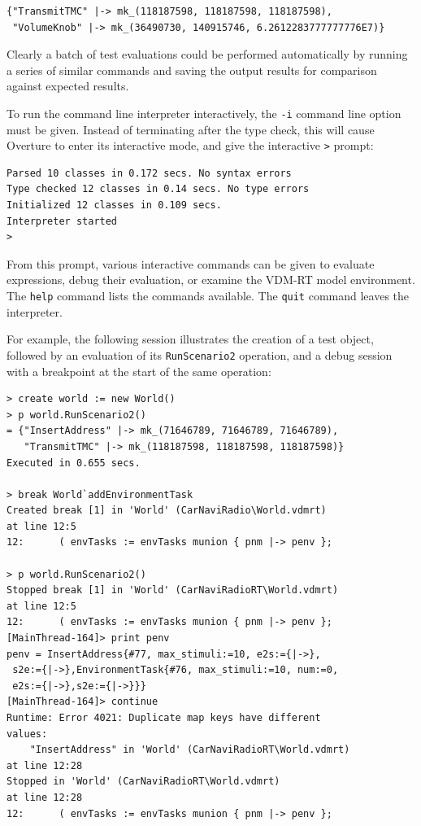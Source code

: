 \begin{lstlisting}
{"TransmitTMC" |-> mk_(118187598, 118187598, 118187598), 
 "VolumeKnob" |-> mk_(36490730, 140915746, 6.2612283777777776E7)}
\end{lstlisting}

Clearly a batch of test evaluations could be performed automatically by running
a series of similar commands and saving the output results for comparison
against expected results.

To run the command line interpreter interactively, the \verb|-i| command line
option must be given. Instead of terminating after the type check, this will
cause Overture to enter its interactive mode, and give the interactive \verb|>|
prompt:

\begin{lstlisting}
Parsed 10 classes in 0.172 secs. No syntax errors
Type checked 12 classes in 0.14 secs. No type errors
Initialized 12 classes in 0.109 secs.
Interpreter started
>
\end{lstlisting}

\noindent From this prompt, various interactive commands can be given to
evaluate expressions, debug their evaluation, or examine the VDM-RT model environment.
The \verb|help| command lists the commands available. The \verb|quit| command
leaves the interpreter.

For example, the following session illustrates the creation of a test object,
followed by an evaluation of its \verb|RunScenario2| operation, and a debug
session with a breakpoint at the start of the same operation:

\begin{lstlisting}
> create world := new World()
> p world.RunScenario2()
= {"InsertAddress" |-> mk_(71646789, 71646789, 71646789), 
   "TransmitTMC" |-> mk_(118187598, 118187598, 118187598)}
Executed in 0.655 secs.

> break World`addEnvironmentTask
Created break [1] in 'World' (CarNaviRadio\World.vdmrt) 
at line 12:5
12:      ( envTasks := envTasks munion { pnm |-> penv };

> p world.RunScenario2()
Stopped break [1] in 'World' (CarNaviRadioRT\World.vdmrt) 
at line 12:5
12:      ( envTasks := envTasks munion { pnm |-> penv };
[MainThread-164]> print penv
penv = InsertAddress{#77, max_stimuli:=10, e2s:={|->},
 s2e:={|->},EnvironmentTask{#76, max_stimuli:=10, num:=0,
 e2s:={|->},s2e:={|->}}}
[MainThread-164]> continue
Runtime: Error 4021: Duplicate map keys have different 
values:
    "InsertAddress" in 'World' (CarNaviRadioRT\World.vdmrt) 
at line 12:28
Stopped in 'World' (CarNaviRadioRT\World.vdmrt) 
at line 12:28
12:      ( envTasks := envTasks munion { pnm |-> penv };
\end{lstlisting}

